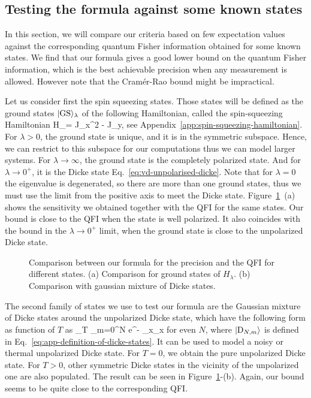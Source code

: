 \subsection{Testing the formula against some known states}
\label{sec:vd-comparison-with-qfi}

In this section, we will compare our criteria based on few expectation values against the corresponding quantum Fisher information obtained for some known states.
We find that our formula gives a good lower bound on the quantum Fisher information, which is the best achievable precision when any measurement is allowed.
However note that the Cramér-Rao bound might be impractical.

Let us consider first the spin squeezing states.
Those states will be defined as the ground states $\vert \text{GS} \rangle_\lambda$ of the following Hamiltonian, called the spin-squeezing Hamiltonian
\be
  H_\lambda = J_x^2 - \lambda J_y,
  \label{eq:vd-ss-hamiltonian}
\ee
see Appendix~\ref{app:spin-squeezing-hamiltonian}.
For $\lambda>0$, the ground state is unique, and it is in the symmetric subspace.
Hence, we can restrict to this subspace for our computations thus we can model larger systems.
For $\lambda\rightarrow\infty$, the ground state is the completely polarized state.
And for $\lambda\rightarrow 0^{+}$, it is the Dicke state Eq.~\eqref{eq:vd-unpolarised-dicke}.
Note that for $\lambda=0$ the eigenvalue is degenerated, so there are more than one ground states, thus we must use the limit from the positive axis to meet the Dicke state.
Figure~\ref{fig:vd-comparing-the-bounds}~(a) shows the sensitivity we obtained together with the QFI for the same states.
Our bound is close to the QFI when the state is well polarized.
It also coincides with the bound in the $\lambda\rightarrow 0^{+}$ limit, when the ground state is close to the unpolarized Dicke state.
\begin{figure}[htp]
  \centering
  \caption[Bound against known QFIs for different states.]{Comparison between our formula for the precision and the QFI for different states. (a) Comparison for ground states of $H_\lambda$. (b) Comparison with gaussian mixture of Dicke states.}
  \label{fig:vd-comparing-the-bounds}
\end{figure}

The second family of states we use to test our formula are the Gaussian mixture of Dicke states around the unpolarized Dicke state,
which have the following form as function of $T$ as
\be
  \rho_{T} \propto \sum_{m=0}^{N} e^{- } _x_x
\ee
for even $N$, where $\vert \textnormal{D}_{N,m} \rangle$ is defined in Eq.~\eqref{eq:app-definition-of-dicke-states}.
It can be used to model a noisy or thermal unpolarized Dicke state.
For $T=0$, we obtain the pure unpolarized Dicke state.
For $T>0$, other symmetric Dicke states in the vicinity of the unpolarized one are also populated.
The result can be seen in Figure~\ref{fig:vd-comparing-the-bounds}-(b).
Again, our bound seems to be quite close to the corresponding QFI.

